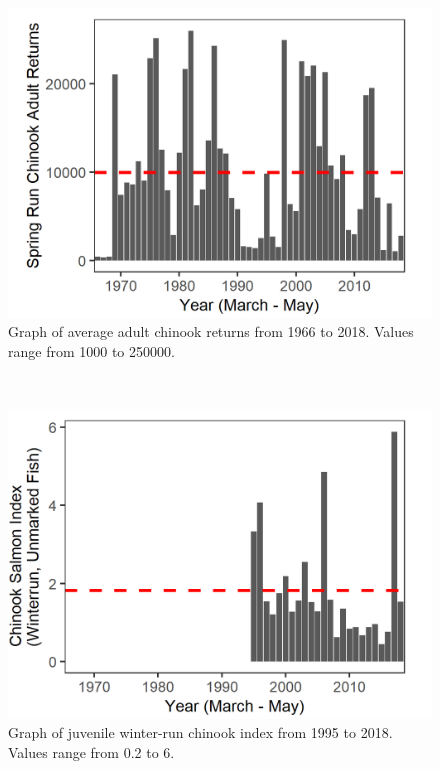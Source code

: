 \documentclass[
]{book}
\begin{document}
\begin{panel-grid}
\begin{columns-nocenter}
\begin{column800}
\begin{expand}
\begin{figure}
\includegraphics[width=15.25in]{figures/SpringRun_1966} \caption{Graph of average adult chinook returns from 1966 to 2018. Values range from 1000 to 250000.}\label{fig:unnamed-chunk-36}
\end{figure}

\end{expand}

\end{column800}

\begin{column40}

~

\end{column40}

\begin{column800}

\begin{expand}

\begin{figure}
\includegraphics[width=15.25in]{figures/DJFMP_chinook_winterByLength_allyears} \caption{Graph of juvenile winter-run chinook index from 1995 to 2018. Values range from 0.2 to 6.}\label{fig:unnamed-chunk-37}
\end{figure}


\end{expand}
\end{column800}
\end{columns-nocenter}
\end{panel-grid}
\end{document}
